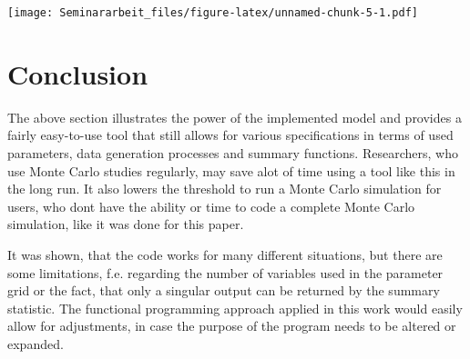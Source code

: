 \documentclass[11pt,a4paper]{article}
\newenvironment{Shaded}{\begin{snugshade}}{\end{snugshade}}
\newcommand{\AttributeTok}[1]{\textcolor[rgb]{0.77,0.63,0.00}{#1}}
\newcommand{\FunctionTok}[1]{\textcolor[rgb]{0.00,0.00,0.00}{#1}}
\newcommand{\NormalTok}[1]{#1}
\newcommand{\OtherTok}[1]{\textcolor[rgb]{0.56,0.35,0.01}{#1}}
\newcommand{\SpecialCharTok}[1]{\textcolor[rgb]{0.00,0.00,0.00}{#1}}
\newcommand{\StringTok}[1]{\textcolor[rgb]{0.31,0.60,0.02}{#1}}
\begin{document}
\begin{Shaded}
\end{Shaded}

\texttt{[image: Seminararbeit\_files/figure-latex/unnamed-chunk-5-1.pdf]}

\pagebreak

\hypertarget{conclusion}{%
\section{Conclusion}\label{conclusion}}

The above section illustrates the power of the implemented model and
provides a fairly easy-to-use tool that still allows for various
specifications in terms of used parameters, data generation processes
and summary functions. Researchers, who use Monte Carlo studies
regularly, may save alot of time using a tool like this in the long run.
It also lowers the threshold to run a Monte Carlo simulation for users,
who dont have the ability or time to code a complete Monte Carlo
simulation, like it was done for this paper.

It was shown, that the code works for many different situations, but
there are some limitations, f.e. regarding the number of variables used
in the parameter grid or the fact, that only a singular output can be
returned by the summary statistic. The functional programming approach
applied in this work would easily allow for adjustments, in case the
purpose of the program needs to be altered or expanded.
\end{document}
